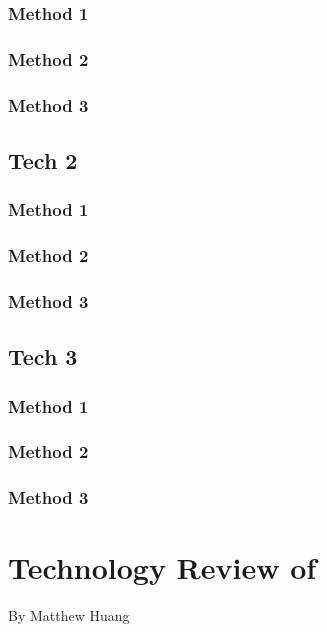 \documentclass[10pt,journal,compsoc,draftclsnofoot]{IEEEtran}
\begin{document}
\begin{flushleft}
\subsubsection{Method 1}

\subsubsection{Method 2}

\subsubsection{Method 3}

\subsection{Tech 2}

\subsubsection{Method 1}

\subsubsection{Method 2}

\subsubsection{Method 3}

\subsection{Tech 3}

\subsubsection{Method 1}

\subsubsection{Method 2}

\subsubsection{Method 3}

\newpage

\section{Technology Review of}
\large{By Matthew Huang}


\end{flushleft}
\end{document}
